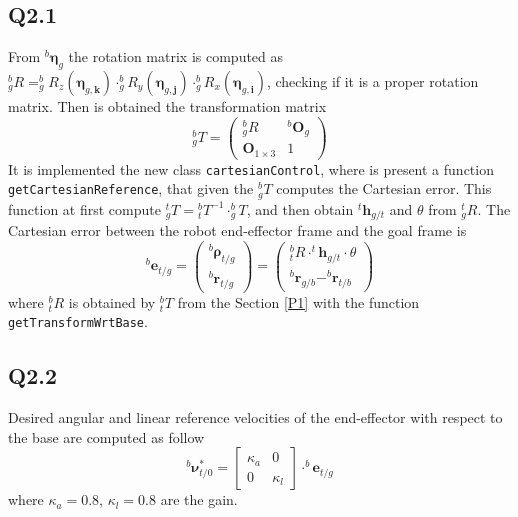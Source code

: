 \subsection{Q2.1}
From $^b \boldsymbol\eta_{g}$ the rotation matrix is computed as $^b_g R = ^b_g R_z(\boldsymbol\eta_{g,\mathbf k}) \cdot ^b_g R_y(\boldsymbol\eta_{g,\mathbf j}) \cdot ^b_g R_x(\boldsymbol\eta_{g,\mathbf i})$, checking if it is a proper rotation matrix. Then is obtained the transformation matrix
\begin{equation*} \renewcommand{\arraystretch}{1.5}
	^b_g T = \begin{pmatrix}
		^b_g R & ^b \mathbf{O}_{g} \\
		\mathbf{O}_{1 \times 3} & 1
	\end{pmatrix}
\end{equation*}
It is implemented the new class \verb*|cartesianControl|, where is present a function \verb*|getCartesianReference|, that given the $^b_g T$ computes the Cartesian error.
This function at first compute $^t_g T = {} ^b_t T^{-1} \cdot ^b_g T$, and then obtain $^t\mathbf{h}_{g/t}$ and $\theta$ from $^t_g R$.
The Cartesian error between the robot end-effector frame and the goal frame is
\begin{equation*} \renewcommand{\arraystretch}{1.5}
	^b \mathbf{e}_{t/g} = \begin{pmatrix}
		^b \boldsymbol\rho_{t/g} \\ 
		^b \mathbf{r}_{t/g}
	\end{pmatrix} = \begin{pmatrix}
		^b_t R \cdot ^t\mathbf{h}_{g/t} \cdot \theta \\ 
		^b \mathbf{r}_{g/b} - ^b \mathbf{r}_{t/b}
	\end{pmatrix}
\end{equation*}
where $^b_t R$ is obtained by $^b_t T$ from the Section \ref{P1} with the function \verb*|getTransformWrtBase|.

\subsection{Q2.2}
Desired angular and linear reference velocities of the end-effector  with respect to the base are computed as follow
\begin{equation*}
	^b \boldsymbol\nu^*_{t/0} = \begin{bmatrix}
		\kappa_a &0\\
		0 &\kappa_l
	\end{bmatrix}\cdot 	^b \mathbf{e}_{t/g}
\end{equation*}
where $\kappa_{a} = 0.8$, $\kappa_{l} = 0.8$ are the gain.

